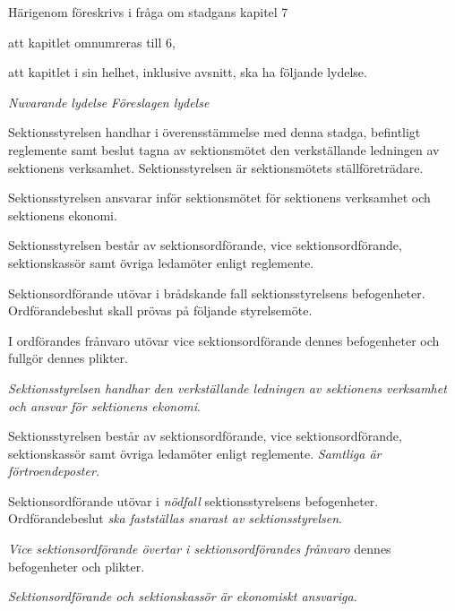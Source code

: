 \documentclass{article}
\newenvironment{lydelse}
    {\begin{paracol}{2}%
        \emph{Nuvarande lydelse}%
        \switchcolumn%
        \emph{Föreslagen lydelse}%
    \end{paracol}%
    \begin{enumerate}[label=\thesubsection.\arabic*]%
    \begin{paracol}{2}%
    }{\end{paracol}\end{enumerate}}
\begin{document}
Härigenom föreskrivs i fråga om stadgans kapitel 7
\begin{dels}
  \item att kapitlet omnumreras till 6,
  \item att kapitlet i sin helhet, inklusive avsnitt, ska ha följande lydelse.
\end{dels}

\begin{lydelse}
  \setcounter{section}{7}
  \setcounter{subsection}{1}
  \item Sektionsstyrelsen handhar i överensstämmelse med denna stadga, befintligt reglemente samt beslut tagna av sektionsmötet den verkställande ledningen av sektionens verksamhet. Sektionsstyrelsen är sektionsmötets ställföreträdare.

  \setcounter{subsection}{3}
  \setcounter{enumi}{0}
  \item Sektionsstyrelsen ansvarar inför sektionsmötet för sektionens verksamhet och sektionens ekonomi.

  \setcounter{section}{7}
  \setcounter{subsection}{2}
  \item Sektionsstyrelsen består av sektionsordförande, vice sektionsordförande, sektionskassör samt övriga ledamöter enligt reglemente.

  \setcounter{subsection}{9}
  \item Sektionsordförande utövar i brådskande fall sektionsstyrelsens befogenheter. Ordförandebeslut skall prövas på följande styrelsemöte.

  \item I ordförandes frånvaro utövar vice sektionsordförande dennes befogenheter och fullgör dennes plikter.
\switchcolumn
  \item \emph{Sektionsstyrelsen handhar den verkställande ledningen av sektionens verksamhet och ansvar för sektionens ekonomi}.

  \item Sektionsstyrelsen består av sektionsordförande, vice sektionsordförande, sektionskassör samt övriga ledamöter enligt reglemente.
    \emph{Samtliga är förtroendeposter.}

  \item Sektionsordförande utövar i \emph{nödfall} sektionsstyrelsens befogenheter.
    Ordförandebeslut \emph{ska fastställas snarast av sektionsstyrelsen}.

  \item \emph{Vice sektionsordförande övertar i sektionsordförandes frånvaro} dennes befogenheter och plikter.

  \item \emph{Sektionsordförande och sektionskassör är ekonomiskt ansvariga.}
\end{lydelse}
\setcounter{section}{6}
\setcounter{subsection}{0}
\end{document}
